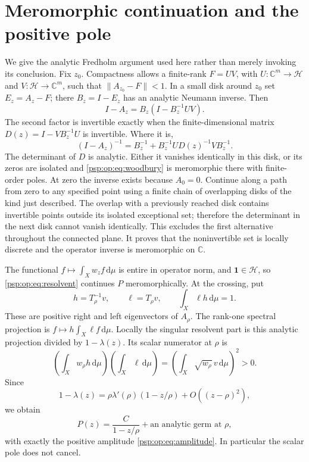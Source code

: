 \documentclass[11pt,letterpaper]{article}
\numberwithin{equation}{section}
\theoremstyle{remark}\newtheorem{remark}[theorem]{Remark}
\newcommand{\dd}{\,\mathrm d}
\newcommand{\one}{\mathbf1}
\newcommand{\CC}{\mathbb C}
\begin{document}
\section{Meromorphic continuation and the positive pole}\label{psp:op:sec:fredholm}
We give the analytic Fredholm argument used here rather than merely
invoking its conclusion. Fix $z_0$. Compactness allows a finite-rank
$F=UV$, with $U:\CC^m\to\mathcal H$ and $V:\mathcal H\to\CC^m$,
such that $\|A_{z_0}-F\|<1$. In a small disk around $z_0$ set
$E_z=A_z-F$; there $B_z=I-E_z$ has an analytic Neumann inverse.
Then
\[
 I-A_z=B_z(I-B_z^{-1}UV).
\]
The second factor is invertible exactly when the finite-dimensional
matrix $D(z)=I-VB_z^{-1}U$ is invertible. Where it is,
\begin{equation}\label{psp:op:eq:woodbury}
 (I-A_z)^{-1}=B_z^{-1}
    +B_z^{-1}U D(z)^{-1}VB_z^{-1}.
\end{equation}
The determinant of $D$ is analytic. Either it vanishes identically in
this disk, or its zeros are isolated and \eqref{psp:op:eq:woodbury} is
meromorphic there with finite-order poles. At zero the inverse
exists because $A_0=0$. Continue along a path from zero to any
specified point using a finite chain of overlapping disks of the
kind just described. The overlap with a previously reached disk
contains invertible points outside its isolated exceptional set;
therefore the determinant in the next disk cannot vanish identically.
This excludes the first alternative throughout the connected plane.
It proves that the noninvertible set is locally discrete and the
operator inverse is meromorphic on $\CC$.

The functional $f\mapsto\int_Xw_zf\dd\mu$ is entire in operator
norm, and $\one\in\mathcal H$, so \eqref{psp:op:eq:resolvent} continues
$P$ meromorphically. At the crossing, put
\[
 h=T_\rho^{-1}v,\qquad \ell=T_\rho v,
 \qquad \int_X\ell h\dd\mu=1.
\]
These are positive right and left eigenvectors of $A_\rho$. The
rank-one spectral projection is
$f\mapsto h\int_X\ell f\dd\mu$. Locally the singular resolvent
part is this analytic projection divided by $1-\lambda(z)$.
Its scalar numerator at $\rho$ is
\begin{equation}\label{psp:op:eq:numerator}
 \left(\int_Xw_\rho h\dd\mu\right)
 \left(\int_X\ell\dd\mu\right)
 =\left(\int_X\sqrt{w_\rho}\,v\dd\mu\right)^2>0.
\end{equation}
Since
\[
 1-\lambda(z)=\rho\lambda'(\rho)(1-z/\rho)+O((z-\rho)^2),
\]
we obtain
\begin{equation}\label{psp:op:eq:pole}
 P(z)=\frac{C}{1-z/\rho}+\text{an analytic germ at }\rho,
\end{equation}
with exactly the positive amplitude \eqref{psp:op:eq:amplitude}. In
particular the scalar pole does not cancel.
\end{document}
